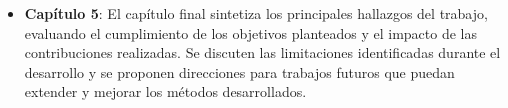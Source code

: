 \begin{itemize}
    \item\textbf{Capítulo 5}: El capítulo final sintetiza los principales hallazgos del trabajo, evaluando el cumplimiento de los objetivos planteados y el impacto de las contribuciones realizadas. Se discuten las limitaciones identificadas durante el desarrollo y se proponen direcciones para trabajos futuros que puedan extender y mejorar los métodos desarrollados.
\end{itemize}






